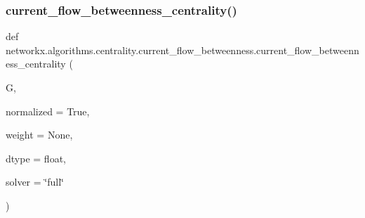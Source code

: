 \subsubsection{\texorpdfstring{current\+\_\+flow\+\_\+betweenness\+\_\+centrality()}{current\_flow\_betweenness\_centrality()}}
{\footnotesize\ttfamily def networkx.\+algorithms.\+centrality.\+current\+\_\+flow\+\_\+betweenness.\+current\+\_\+flow\+\_\+betweenness\+\_\+centrality (\begin{DoxyParamCaption}\item[{}]{G,  }\item[{}]{normalized = {\ttfamily True},  }\item[{}]{weight = {\ttfamily None},  }\item[{}]{dtype = {\ttfamily float},  }\item[{}]{solver = {\ttfamily \char`\"{}full\char`\"{}} }\end{DoxyParamCaption})}

